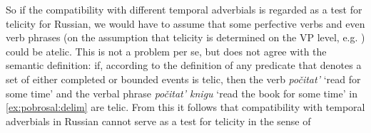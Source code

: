 %
%
%

So if the compatibility with different temporal adverbials is regarded as a test for telicity for Russian, we would have to assume that some perfective verbs and even verb phrases (on the assumption that telicity is determined on the VP level, e.g. \citealt{Borer:05}) could be atelic. This is not a problem per se, but does not agree with the semantic definition: if, according to the definition of \citet[3]{Rothstein:08a} any predicate that denotes a set of either completed or bounded events is telic, then the verb \textit{po\v{c}itat'} `read for some time' and the verbal phrase \textit{po\v{c}itat' knigu} `read the book for some time' in \ref{ex:pobrosal:delim} are telic. From this it follows that compatibility with temporal adverbials in Russian cannot serve as a test for telicity in the sense of \citet{Rothstein:08a}


